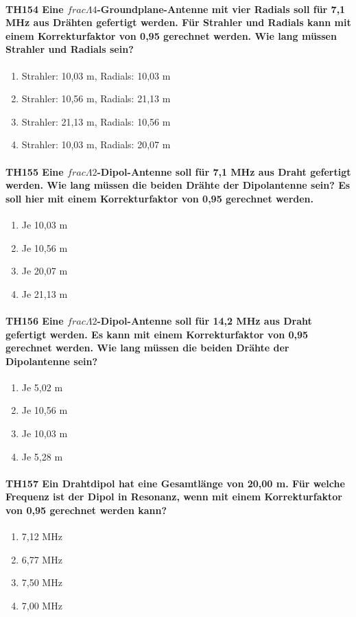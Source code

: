 \documentclass[8pt]{article}
\begin{document}
\paragraph*{TH154 Eine $frac{\Lambda}{4}$-Groundplane-Antenne mit vier Radials soll für 7,1 MHz aus Drähten gefertigt werden. Für Strahler und Radials kann mit einem Korrekturfaktor von 0,95 gerechnet werden. Wie lang müssen Strahler und Radials sein?}
\begin{enumerate}[nolistsep,label=\Alph*]
\item Strahler: 10,03 m, Radials: 10,03 m
\item Strahler: 10,56 m, Radials: 21,13 m
\item Strahler: 21,13 m, Radials: 10,56 m
\item Strahler: 10,03 m, Radials: 20,07 m
\end{enumerate}

\paragraph*{TH155 Eine $frac{\Lambda}{2}$-Dipol-Antenne soll für 7,1 MHz aus Draht gefertigt werden. Wie lang müssen die beiden Drähte der Dipolantenne sein? Es soll hier mit einem Korrekturfaktor von 0,95 gerechnet werden.}
\begin{enumerate}[nolistsep,label=\Alph*]
\item Je 10,03 m
\item Je 10,56 m
\item Je 20,07 m
\item Je 21,13 m
\end{enumerate}

\paragraph*{TH156 Eine $frac{\Lambda}{2}$-Dipol-Antenne soll für 14,2 MHz aus Draht gefertigt werden. Es kann mit einem Korrekturfaktor von 0,95 gerechnet werden. Wie lang müssen die beiden Drähte der Dipolantenne sein?}
\begin{enumerate}[nolistsep,label=\Alph*]
\item Je 5,02 m
\item Je 10,56 m
\item Je 10,03 m
\item Je 5,28 m
\end{enumerate}

\paragraph*{TH157 Ein Drahtdipol hat eine Gesamtlänge von 20,00 m. Für welche Frequenz ist der Dipol in Resonanz, wenn mit einem Korrekturfaktor von 0,95 gerechnet werden kann?} 
\begin{enumerate}[nolistsep,label=\Alph*]
\item 7,12 MHz
\item 6,77 MHz
\item 7,50 MHz
\item 7,00 MHz
\end{enumerate}
\end{document}
